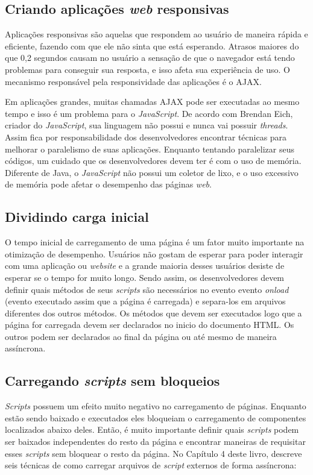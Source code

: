 \subsection{Criando aplicações \textit{web} responsivas}
\label{subsec:evenfaster_cap2}
Aplicações responsivas são aquelas que respondem ao usuário de maneira rápida e eficiente, fazendo com que ele não sinta que está esperando. Atrasos maiores do que 0,2 segundos causam no usuário a sensação de que o navegador está tendo problemas para conseguir sua resposta, e isso afeta sua experiência de uso. O mecanismo responsável pela responsividade das aplicações é o AJAX.

Em aplicações grandes, muitas chamadas AJAX pode ser executadas ao mesmo tempo e isso é um problema para o \textit{JavaScript}. De acordo com Brendan Eich, criador do \textit{JavaScript}, sua linguagem não possui e nunca vai possuir \textit{threads}. Assim fica por responsabilidade dos desenvolvedores encontrar técnicas para melhorar o paralelismo de suas aplicações. Enquanto tentando paralelizar seus códigos, um cuidado que os desenvolvedores devem ter é com o uso de memória. Diferente de Java, o \textit{JavaScript} não possui um coletor de lixo, e o uso excessivo de memória pode afetar o desempenho das páginas \textit{web}.

\subsection{Dividindo carga inicial}
\label{subsec:evenfaster_cap3}
O tempo inicial de carregamento de uma página é um fator muito importante na otimização de desempenho. Usuários não gostam de esperar para poder interagir com uma aplicação ou \textit{website} e a grande maioria desses usuários desiste de esperar se o tempo for muito longo. Sendo assim, os desenvolvedores devem definir quais métodos de seus \textit{scripts} são necessários no evento evento \textit{onload} (evento executado assim que a página é carregada) e separa-los em arquivos diferentes dos outros métodos. Os métodos que devem ser executados logo que a página for carregada devem ser declarados no inicio do documento HTML. Os outros podem ser declarados ao final da página ou até mesmo de maneira assíncrona.

\subsection{Carregando \textit{scripts} sem bloqueios}
\label{subsec:evenfaster_cap4}
\textit{Scripts} possuem um efeito muito negativo no carregamento de páginas. Enquanto estão sendo baixado e executados eles bloqueiam o carregamento de componentes localizados abaixo deles. Então, é muito importante definir quais \textit{scripts} podem ser baixados independentes do resto da página e encontrar maneiras de requisitar esses \textit{scripts} sem bloquear o resto da página. No Capítulo 4 deste livro,  descreve seis técnicas de como carregar arquivos de \textit{script} externos de forma assíncrona:

